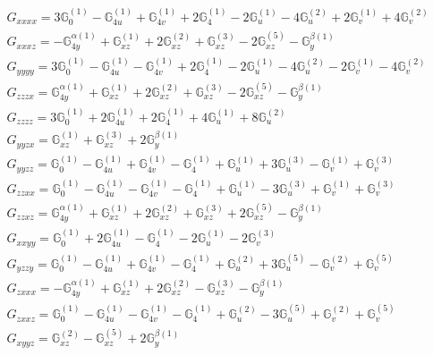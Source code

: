 \documentclass[fleqn,8pt,landscape]{jsarticle}
\begin{document}
\begin{align*}
& G_{xxxx} = 3 \mathbb{G}_{0}^{(1)} - \mathbb{G}_{4u}^{(1)} + \mathbb{G}_{4v}^{(1)} + 2 \mathbb{G}_{4}^{(1)} - 2 \mathbb{G}_{u}^{(1)} - 4 \mathbb{G}_{u}^{(2)} + 2 \mathbb{G}_{v}^{(1)} + 4 \mathbb{G}_{v}^{(2)} \\
& G_{xxxz} = - \mathbb{G}_{4y}^{\alpha(1)} + \mathbb{G}_{xz}^{(1)} + 2 \mathbb{G}_{xz}^{(2)} + \mathbb{G}_{xz}^{(3)} - 2 \mathbb{G}_{xz}^{(5)} - \mathbb{G}_{y}^{\beta(1)} \\
& G_{yyyy} = 3 \mathbb{G}_{0}^{(1)} - \mathbb{G}_{4u}^{(1)} - \mathbb{G}_{4v}^{(1)} + 2 \mathbb{G}_{4}^{(1)} - 2 \mathbb{G}_{u}^{(1)} - 4 \mathbb{G}_{u}^{(2)} - 2 \mathbb{G}_{v}^{(1)} - 4 \mathbb{G}_{v}^{(2)} \\
& G_{zzzx} = \mathbb{G}_{4y}^{\alpha(1)} + \mathbb{G}_{xz}^{(1)} + 2 \mathbb{G}_{xz}^{(2)} + \mathbb{G}_{xz}^{(3)} - 2 \mathbb{G}_{xz}^{(5)} - \mathbb{G}_{y}^{\beta(1)} \\
& G_{zzzz} = 3 \mathbb{G}_{0}^{(1)} + 2 \mathbb{G}_{4u}^{(1)} + 2 \mathbb{G}_{4}^{(1)} + 4 \mathbb{G}_{u}^{(1)} + 8 \mathbb{G}_{u}^{(2)} \\
& G_{yyzx} = \mathbb{G}_{xz}^{(1)} + \mathbb{G}_{xz}^{(3)} + 2 \mathbb{G}_{y}^{\beta(1)} \\
& G_{yyzz} = \mathbb{G}_{0}^{(1)} - \mathbb{G}_{4u}^{(1)} + \mathbb{G}_{4v}^{(1)} - \mathbb{G}_{4}^{(1)} + \mathbb{G}_{u}^{(1)} + 3 \mathbb{G}_{u}^{(3)} - \mathbb{G}_{v}^{(1)} + \mathbb{G}_{v}^{(3)} \\
& G_{zzxx} = \mathbb{G}_{0}^{(1)} - \mathbb{G}_{4u}^{(1)} - \mathbb{G}_{4v}^{(1)} - \mathbb{G}_{4}^{(1)} + \mathbb{G}_{u}^{(1)} - 3 \mathbb{G}_{u}^{(3)} + \mathbb{G}_{v}^{(1)} + \mathbb{G}_{v}^{(3)} \\
& G_{zzxz} = \mathbb{G}_{4y}^{\alpha(1)} + \mathbb{G}_{xz}^{(1)} + 2 \mathbb{G}_{xz}^{(2)} + \mathbb{G}_{xz}^{(3)} + 2 \mathbb{G}_{xz}^{(5)} - \mathbb{G}_{y}^{\beta(1)} \\
& G_{xxyy} = \mathbb{G}_{0}^{(1)} + 2 \mathbb{G}_{4u}^{(1)} - \mathbb{G}_{4}^{(1)} - 2 \mathbb{G}_{u}^{(1)} - 2 \mathbb{G}_{v}^{(3)} \\
& G_{yzzy} = \mathbb{G}_{0}^{(1)} - \mathbb{G}_{4u}^{(1)} + \mathbb{G}_{4v}^{(1)} - \mathbb{G}_{4}^{(1)} + \mathbb{G}_{u}^{(2)} + 3 \mathbb{G}_{u}^{(5)} - \mathbb{G}_{v}^{(2)} + \mathbb{G}_{v}^{(5)} \\
& G_{zxxx} = - \mathbb{G}_{4y}^{\alpha(1)} + \mathbb{G}_{xz}^{(1)} + 2 \mathbb{G}_{xz}^{(2)} - \mathbb{G}_{xz}^{(3)} - \mathbb{G}_{y}^{\beta(1)} \\
& G_{zxxz} = \mathbb{G}_{0}^{(1)} - \mathbb{G}_{4u}^{(1)} - \mathbb{G}_{4v}^{(1)} - \mathbb{G}_{4}^{(1)} + \mathbb{G}_{u}^{(2)} - 3 \mathbb{G}_{u}^{(5)} + \mathbb{G}_{v}^{(2)} + \mathbb{G}_{v}^{(5)} \\
& G_{xyyz} = \mathbb{G}_{xz}^{(2)} - \mathbb{G}_{xz}^{(5)} + 2 \mathbb{G}_{y}^{\beta(1)}
\end{align*}
\end{document}
